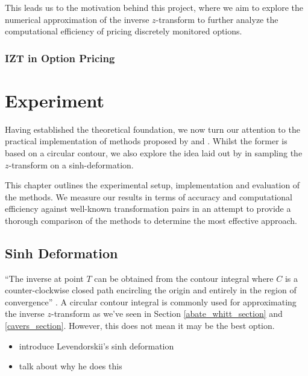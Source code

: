 \documentclass[a4paper]{report}
\begin{document}
This leads us to the motivation behind this project, where we aim to explore the numerical approximation of the inverse $z$-transform to further analyze the computational efficiency of pricing discretely monitored options.

\subsection{IZT in Option Pricing}


\chapter{Experiment}
Having established the theoretical foundation, we now turn our attention to the practical implementation of methods proposed by \citet{AbateWhitt1992a, AbateWhitt1992b} and \citet{Cavers1978FFT}. Whilst the former is based on a circular contour, we also explore the idea laid out by \citet{levendorskii2022sinh} in sampling the $z$-transform on a sinh-deformation.

This chapter outlines the experimental setup, implementation and evaluation of the methods. We measure our results in terms of accuracy and computational efficiency against well-known transformation pairs in an attempt to provide a thorough comparison of the methods to determine the most effective approach.

\section{Sinh Deformation}
``The inverse at point $T$ can be obtained from the contour integral where $C$ is a counter-clockwise closed path encircling the origin and entirely in the region of convergence'' \citep{horvath2020numerical}. A circular contour integral is commonly used for approximating the inverse $z$-transform as we've seen in Section \ref{abate_whitt_section} and \ref{cavers_section}. However, this does not mean it may be the best option. 

\begin{itemize}
    \item introduce Levendorskii's sinh deformation
    \item talk about why he does this
\end{itemize}
\end{document}
